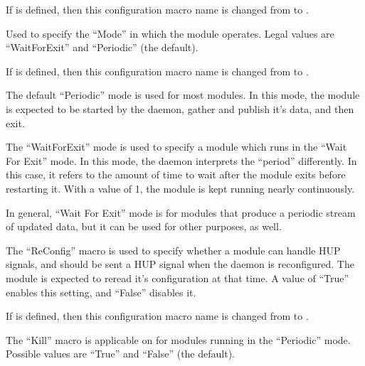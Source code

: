 \begin{description}
    If 
    is defined, then this configuration macro name is changed from
     to
    .


\item[\Macro{STARTD\_CRON\_<ModuleName>\_MODE}]
\label{param:StartdCronModuleMode}
    Used to specify the ``Mode'' in which the module operates.
    Legal values are ``WaitForExit'' and ``Periodic'' (the
    default).  

    If 
    is defined, then this configuration macro name is changed from
     to
    .

    The default ``Periodic'' mode is used for most modules.  In
    this mode, the module is expected to be started by the
     daemon, gather and publish it's data, and then
    exit.

    The ``WaitForExit'' mode is used to specify a module
    which runs in the ``Wait For Exit'' mode.
    In this mode, the  daemon
    interprets the ``period'' differently.  In this case, it
    refers to the amount of time to wait after the module exits
    before restarting it.  With a value of 1, the module is kept
    running nearly continuously.

    In general, ``Wait For Exit'' mode is for modules that produce
    a periodic stream of updated data, but it can be used for other
    purposes, as well.


\item[\Macro{STARTD\_CRON\_<ModuleName>\_RECONFIG}]
\label{param:StartdCronModuleReconfig}
    The ``ReConfig'' macro is used to specify whether a module
    can handle HUP signals, and should be sent a HUP signal when
    the  daemon is reconfigured.  The module is
    expected to reread it's configuration at that time.  A value
    of ``True'' enables this setting, and ``False'' disables it.

    If 
    is defined, then this configuration macro name is changed from
     to
    .

\item[\Macro{STARTD\_CRON\_<ModuleName>\_KILL}]
\label{param:StartdCronModuleKill}
    The ``Kill'' macro is applicable on for modules running in the
    ``Periodic'' mode.  Possible values are ``True'' and ``False'' (the
    default).


\end{description}

